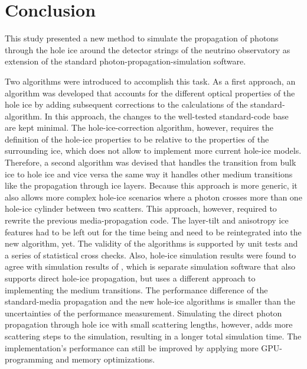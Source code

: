 
\section{Conclusion}
\label{sec:conclusion}

This study presented a new method to simulate the propagation of photons through the hole ice around the detector strings of the \icecube neutrino observatory as extension of the standard \clsim photon-propagation-simulation software.

Two algorithms were introduced to accomplish this task.
As a first approach, an algorithm was developed that accounts for the different optical properties of the hole ice by adding subsequent corrections to the calculations of the standard-\clsim algorithm.
In this approach, the changes to the well-tested standard-\clsim code base are kept minimal.
The hole-ice-correction algorithm, however, requires the definition of the hole-ice properties to be relative to the properties of the surrounding ice, which does not allow to implement more current hole-ice models.
Therefore, a second algorithm was devised that handles the transition from bulk ice to hole ice and vice versa the same way it handles other medium transitions like the propagation through ice layers.
Because this approach is more generic, it also allows more complex hole-ice scenarios where a photon crosses more than one hole-ice cylinder between two scatters.
This approach, however, required to rewrite the previous \clsim media-propagation code.
The layer-tilt and anisotropy ice features had to be left out for the time being and need to be reintegrated into the new algorithm, yet.
The validity of the algorithms is supported by unit tests and a series of statistical cross checks.
Also, \clsim hole-ice simulation results were found to agree with simulation results of \ppc, which is separate \icecube simulation software that also supports direct hole-ice propagation, but uses a different approach to implementing the medium transitions.
The performance difference of the standard-\clsim media propagation and the new hole-ice algorithms is smaller than the uncertainties of the performance measurement.
Simulating the direct photon propagation through hole ice with small scattering lengths, however, adds more scattering steps to the simulation, resulting in a longer total simulation time.
The implementation's performance can still be improved by applying more GPU-programming and memory optimizations.

